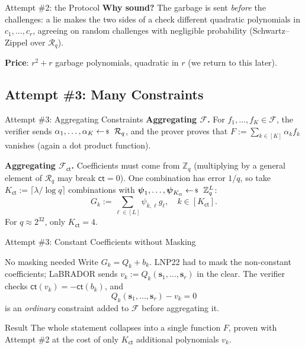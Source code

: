 \documentclass{zkdl-presentation-template}
\begin{document}
\begin{frame}{Attempt \#2: the Protocol}
        \vspace{5pt}
        \textbf{Why sound?} The garbage is sent \emph{before} the challenges: a lie makes the two sides of a check different quadratic polynomials in $c_1, \dots, c_r$, agreeing on random challenges with negligible probability (Schwartz--Zippel over $\mathcal{R}_q$).
        \pause

        \textbf{Price}: $r^2 + r$ garbage polynomials, quadratic in $r$ (we return to this later).
    \end{frame}

    \subsection{Attempt \#3: Many Constraints}

    \begin{frame}{Attempt \#3: Aggregating Constraints}
        \textbf{Aggregating $\mathcal{F}$.} For $f_1,\dots,f_K \in \mathcal{F}$, the verifier sends $\alpha_1, \dots, \alpha_K \leftarrowS \mathcal{R}_q$, and the prover proves that $F := \sum_{k \in [K]} \alpha_kf_k$ vanishes (again a dot product function).
        \pause

        \textbf{Aggregating $\mathcal{F}_{\mathsf{ct}}$.} Coefficients must come from $\mathbb{Z}_q$ (multiplying by a general element of $\mathcal{R}_q$ may break $\mathsf{ct} = 0$). One combination has error $1/q$, so take $K_{\mathsf{ct}} := \lceil \lambda/\log q \rceil$ combinations with $\boldsymbol{\psi}_1, \dots, \boldsymbol{\psi}_{K_{\mathsf{ct}}} \leftarrowS \mathbb{Z}_q^L$:
        \begin{equation*}
            G_k := \sum_{\ell \in [L]} \psi_{k,\ell}g_{\ell}, \quad k \in [K_{\mathsf{ct}}].
        \end{equation*}
        For $q \approx 2^{32}$, only $K_{\mathsf{ct}} = 4$.
    \end{frame}

    \begin{frame}{Attempt \#3: Constant Coefficients without Masking}
        \begin{block}{No masking needed}
            Write $G_k = Q_k + b_k$. LNP22 had to mask the non-constant coefficients; LaBRADOR sends $v_k := Q_k(\mathbf{s}_1, \dots, \mathbf{s}_r)$ in the clear. The verifier checks $\mathsf{ct}(v_k) = -\mathsf{ct}(b_k)$, and
            \begin{equation*}
                Q_k(\mathbf{s}_1, \dots, \mathbf{s}_r) - v_k = 0
            \end{equation*}
            is an \emph{ordinary} constraint added to $\mathcal{F}$ before aggregating it.
        \end{block}
        \pause

        \begin{remarkblock}{Result}
            The whole statement collapses into a single function $F$, proven with Attempt \#2 at the cost of only $K_{\mathsf{ct}}$ additional polynomials $v_k$.
        \end{remarkblock}
    \end{frame}
\end{document}
